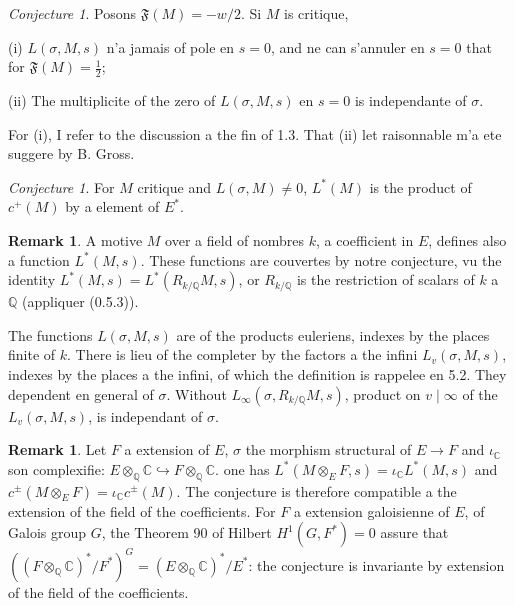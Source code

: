 \documentclass[12pt,a4paper]{article}
\theoremstyle{plain}
\theoremstyle{definition}
\newtheorem{remark}[definition]{Remark}
\theoremstyle{remark}
\newtheorem{conjecture}[definition]{Conjecture}
\newcommand{\Q}{\mathbb{Q}}
\newcommand{\C}{\mathbb{C}}
\begin{document}
\begin{conjecture}\label{conj:2.7}
Posons $\mathfrak{F}(M) = -w/2$. Si $M$ is critique,

\textup{(i)} $L(\sigma, M, s)$ n'a jamais of pole en $s = 0$, and ne can s'annuler en $s = 0$ that
for $\mathfrak{F}(M) = \tfrac{1}{2}$;

\textup{(ii)} The multiplicite of the zero of $L(\sigma, M, s)$ en $s = 0$ is independante of $\sigma$.
\end{conjecture}

For (i), I refer to the discussion a the fin of 1.3. That (ii) let raisonnable m'a ete
suggere by B. Gross.

\begin{conjecture}\label{conj:2.8}
For $M$ critique and $L(\sigma, M) \neq 0$, $L^*(M)$ is the product of $c^+(M)$ by a
element of $E^*$.
\end{conjecture}

\begin{remark}
A motive $M$ over a field of nombres $k$, a coefficient in $E$, defines also a
function $L^*(M, s)$. These functions are couvertes by notre conjecture, vu the identity
$L^*(M, s) = L^*(R_{k/\Q} M, s)$, or $R_{k/\Q}$ is the restriction of scalars of $k$ a $\Q$
(appliquer (0.5.3)).

The functions $L(\sigma, M, s)$ are of the products euleriens, indexes by the places finite
of $k$. There is lieu of the completer by the factors a the infini $L_v(\sigma, M, s)$, indexes by
the places a the infini, of which the definition is rappelee en 5.2. They dependent en general of
$\sigma$. Without $L_\infty(\sigma, R_{k/\Q} M, s)$, product on $v \mid \infty$ of the $L_v(\sigma, M, s)$, is
independant of $\sigma$.
\end{remark}

\begin{remark}
Let $F$ a extension of $E$, $\sigma$ the morphism structural of $E \to F$ and $\iota_\C$ son
complexifie: $E \otimes_\Q \C \hookrightarrow F \otimes_\Q \C$. one has $L^*(M \otimes_E F, s) = \iota_\C L^*(M, s)$
and $c^\pm(M \otimes_E F) = \iota_\C c^\pm(M)$. The conjecture is therefore compatible a the extension of the
field of the coefficients. For $F$ a extension galoisienne of $E$, of Galois group
$G$, the Theorem 90 of Hilbert $H^1(G, F^*) = 0$ assure that
$((F \otimes_\Q \C)^*/F^*)^G = (E \otimes_\Q \C)^*/E^*$: the conjecture is invariante by
extension of the field of the coefficients.
\end{remark}
\end{document}
